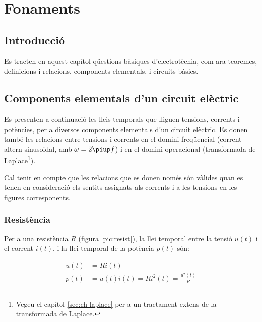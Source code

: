 \chapter{Fonaments}\label{ch:fonaments}

\section{Introducció}
Es tracten en aquest capítol qüestions bàsiques
d'electrotècnia, com ara teoremes, definicions i relacions, components elementals, i circuits bàsics.

\section{Components elementals d'un circuit elèctric}\label{sec:comp_elem}

Es presenten a continuació les lleis temporals que lliguen tensions,
corrents i potències, per a diversos components elementals d'un
circuit elèctric. Es donen també les relacions entre tensions i
corrents en el domini freqüencial (corrent altern sinusoidal, amb
$\omega=2\piup f$) i en el domini operacional (transformada de
Laplace\footnote{Vegeu el capítol \ref{sec:ch-laplace} per a un tractament extens de la transformada de Laplace.}).

Cal tenir en compte que les relacions que es donen només són
vàlides  quan es tenen en consideració els sentits assignats als
corrents i a les tensions en les figures corresponents.

\subsection{Resistència} 

Per a una resistència $R$ (figura
\vref{pic:resist}), la llei temporal entre la tensió $u(t)$ i el
corrent $i(t)$, i la llei temporal de la potència $p(t)$ són:


\hfill
\begin{minipage}[b]{5cm}
	
	\label{pic:resist}
\end{minipage}
\hfill
\begin{minipage}[b][3.25cm][t]{8cm}
	\begin{align}
		u(t) &= R i(t) \\  p(t) &= u(t) i(t) = R i^2(t) = \frac{u^2(t)}{R}
	\end{align}
\end{minipage}


